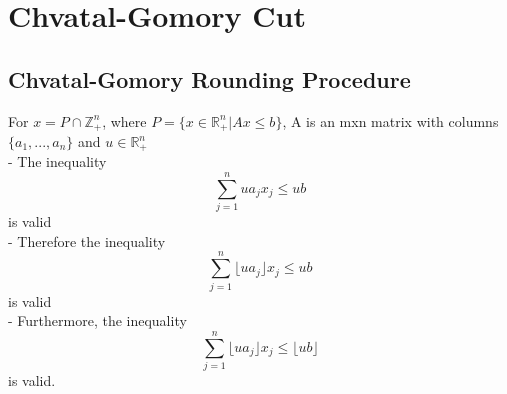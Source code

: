 			\section{Chvatal-Gomory Cut}
				\subsection{Chvatal-Gomory Rounding Procedure}
					For $x=P\cap \mathbb{Z}_+^n$, where $P=\{x\in \mathbb{R}_+^n|Ax \le b\}$, A is an mxn matrix with columns $\{a_1, ..., a_n\}$ and $u \in \mathbb{R}_+^n$\\
					- The inequality
					\begin{equation}
						\sum_{j=1}^n ua_jx_j\le ub 
					\end{equation}
					is valid\\
					- Therefore the inequality
					\begin{equation}
						\sum_{j=1}^n \lfloor ua_j \rfloor x_j \le ub 
					\end{equation}
					is valid\\
					- Furthermore, the inequality
					\begin{equation}
						\sum_{j=1}^n \lfloor ua_j \rfloor x_j \le \lfloor ub \rfloor 
					\end{equation}
					is valid.

